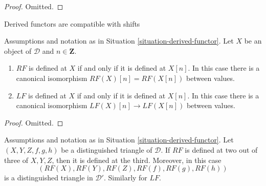 \begin{proof}
Omitted.
\end{proof}

\begin{lemma}
\label{lemma-derived-shift}
\begin{slogan}
Derived functors are compatible with shifts
\end{slogan}
Assumptions and notation as in
Situation \ref{situation-derived-functor}.
Let $X$ be an object of $\mathcal{D}$ and $n \in \mathbf{Z}$.
\begin{enumerate}
\item $RF$ is defined at $X$ if and only if it is defined at $X[n]$.
In this case there is a canonical isomorphism
$RF(X)[n]= RF(X[n])$ between values.
\item $LF$ is defined at $X$ if and only if it is defined at $X[n]$.
In this case there is a canonical isomorphism
$LF(X)[n] \to LF(X[n])$ between values.
\end{enumerate}
\end{lemma}

\begin{proof}
Omitted.
\end{proof}

\begin{lemma}
\label{lemma-2-out-of-3-defined}
Assumptions and notation as in
Situation \ref{situation-derived-functor}.
Let $(X, Y, Z, f, g, h)$ be a distinguished triangle of $\mathcal{D}$.
If $RF$ is defined at two out of three of $X, Y, Z$, then it is defined
at the third. Moreover, in this case
$$
(RF(X), RF(Y), RF(Z), RF(f), RF(g), RF(h))
$$
is a distinguished triangle in $\mathcal{D}'$. Similarly for $LF$.
\end{lemma}

